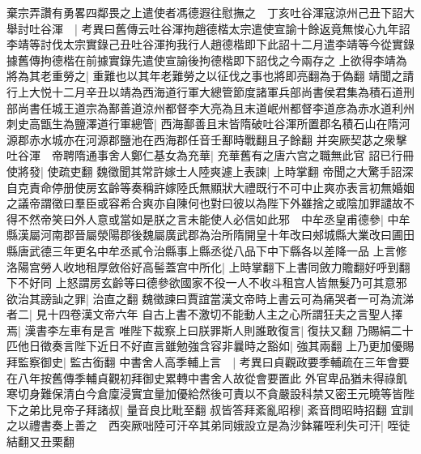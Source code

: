 棄宗弄讚有勇畧四鄰畏之上遣使者馮德遐往慰撫之　丁亥吐谷渾寇涼州己丑下詔大舉討吐谷渾　|{
	考異曰舊傳云吐谷渾拘趙德楷太宗遣使宣諭十餘返竟無悛心九年詔李靖等討伐太宗實錄己丑吐谷渾拘我行人趙德楷即下此詔十二月遣李靖等今從實錄據舊傳拘德楷在前據實錄先遣使宣諭後拘德楷即下詔伐之今兩存之}
上欲得李靖為將為其老重勞之|{
	重難也以其年老難勞之以征伐之事也將即亮翻為于偽翻}
靖聞之請行上大悦十二月辛丑以靖為西海道行軍大總管節度諸軍兵部尚書侯君集為積石道刑部尚書任城王道宗為鄯善道涼州都督李大亮為且末道岷州都督李道彦為赤水道利州刺史高甑生為鹽澤道行軍總管|{
	西海鄯善且末皆隋破吐谷渾所置郡名積石山在隋河源郡赤水城亦在河源郡鹽池在西海郡任音壬鄯時戰翻且子餘翻}
并突厥契苾之衆擊吐谷渾　帝聘隋通事舍人鄭仁基女為充華|{
	充華舊有之唐六宫之職無此官}
詔已行冊使將發|{
	使疏吏翻}
魏徵聞其常許嫁士人陸爽遽上表諫|{
	上時掌翻}
帝聞之大驚手詔深自克責命停册使房玄齡等奏稱許嫁陸氏無顯狀大禮既行不可中止爽亦表言初無婚姻之議帝謂徵曰羣臣或容希合爽亦自陳何也對曰彼以為陛下外雖捨之或陰加罪譴故不得不然帝笑曰外人意或當如是朕之言未能使人必信如此邪　中牟丞皇甫德參|{
	中牟縣漢屬河南郡晉屬滎陽郡後魏屬廣武郡為治所隋開皇十年改曰郟城縣大業改曰圃田縣唐武德三年更名中牟丞貳令治縣事上縣丞從八品下中下縣各以差降一品}
上言修洛陽宫勞人收地租厚斂俗好高髻蓋宫中所化|{
	上時掌翻下上書同斂力贍翻好呼到翻下不好同}
上怒謂房玄齡等曰德參欲國家不役一人不收斗租宫人皆無髮乃可其意邪欲治其謗訕之罪|{
	治直之翻}
魏徵諫曰賈誼當漢文帝時上書云可為痛哭者一可為流涕者二|{
	見十四卷漢文帝六年}
自古上書不激切不能動人主之心所謂狂夫之言聖人擇焉|{
	漢書李左車有是言}
唯陛下裁察上曰朕罪斯人則誰敢復言|{
	復扶又翻}
乃賜絹二十匹他日徵奏言陛下近日不好直言雖勉強含容非曩時之豁如|{
	強其兩翻}
上乃更加優賜拜監察御史|{
	監古銜翻}
中書舍人高季輔上言　|{
	考異曰貞觀政要季輔疏在三年會要在八年按舊傳季輔貞觀初拜御史累轉中書舍人故從會要置此}
外官卑品猶未得祿飢寒切身難保清白今倉廩浸實宜量加優給然後可責以不貪嚴設科禁又密王元曉等皆陛下之弟比見帝子拜諸叔|{
	量音良比毗至翻}
叔皆答拜紊亂昭穆|{
	紊音問昭時招翻}
宜訓之以禮書奏上善之　西突厥咄陸可汗卒其弟同娥設立是為沙鉢羅咥利失可汗|{
	咥徒結翻又丑栗翻}


